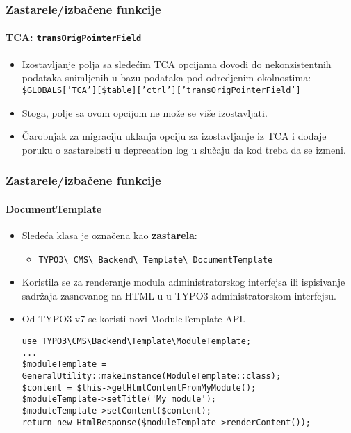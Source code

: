 \begin{frame}[fragile]
	\frametitle{Zastarele/izbačene funkcije}
	\framesubtitle{TCA: \texttt{transOrigPointerField}}

	\begin{itemize}
		\item Izostavljanje polja sa sledećim TCA opcijama dovodi do nekonzistentnih podataka
			snimljenih u bazu podataka pod odredjenim okolnostima:
			\small
				\texttt{\$GLOBALS['TCA'][\$table]['ctrl']['transOrigPointerField']}
			\normalsize

		\item Stoga, polje sa ovom opcijom ne može se više izostavljati.
		\item Čarobnjak za migraciju uklanja opciju za izostavljanje iz TCA i dodaje poruku o zastarelosti
			u deprecation log u slučaju da kod treba da se izmeni.
	\end{itemize}

\end{frame}


\begin{frame}[fragile]
	\frametitle{Zastarele/izbačene funkcije}
	\framesubtitle{DocumentTemplate}

	\lstset{basicstyle=\tiny\ttfamily}

	\begin{itemize}
		\item Sledeća klasa je označena kao \textbf{zastarela}:

			\begin{itemize}
				\item \texttt{TYPO3\textbackslash
					CMS\textbackslash
					Backend\textbackslash
					Template\textbackslash
					DocumentTemplate}
			\end{itemize}

		\item Koristila se za renderanje modula administratorskog interfejsa
			ili ispisivanje sadržaja zasnovanog na HTML-u u TYPO3 administratorskom interfejsu.
		\item Od TYPO3 v7 se koristi novi ModuleTemplate API.

\vspace{-0.4cm}
\begin{lstlisting}
use TYPO3\CMS\Backend\Template\ModuleTemplate;
...
$moduleTemplate = GeneralUtility::makeInstance(ModuleTemplate::class);
$content = $this->getHtmlContentFromMyModule();
$moduleTemplate->setTitle('My module');
$moduleTemplate->setContent($content);
return new HtmlResponse($moduleTemplate->renderContent());
\end{lstlisting}

	\end{itemize}

\end{frame}

